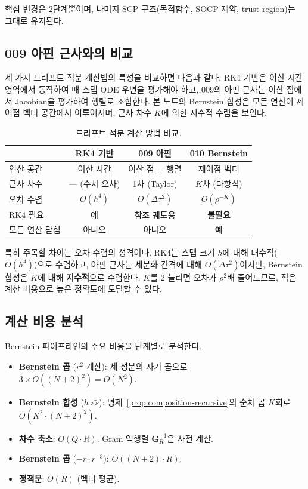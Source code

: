 \documentclass[11pt]{article}
\begin{document}
핵심 변경은 2단계뿐이며, 나머지 SCP 구조(목적함수, SOCP 제약, trust region)는
그대로 유지된다.

\subsection{009 아핀 근사와의 비교}

세 가지 드리프트 적분 계산법의 특성을 비교하면 다음과 같다.
RK4 기반은 이산 시간 영역에서 동작하여 매 스텝 ODE 우변을 평가해야 하고,
009의 아핀 근사는 이산 점에서 Jacobian을 평가하여 행렬로 조합한다.
본 노트의 Bernstein 합성은 모든 연산이 제어점 벡터 공간에서 이루어지며,
근사 차수 $K$에 의한 지수적 수렴을 보인다.

\begin{table}[!h]
\centering
\caption{드리프트 적분 계산 방법 비교.}
\label{tab:method-compare}
\small
\begin{tabular}{@{}lccc@{}}
\toprule
 & RK4 기반 & 009 아핀 & 010 Bernstein \\
\midrule
연산 공간 & 이산 시간 & 이산 점 + 행렬 & 제어점 벡터 \\
근사 차수 & --- (수치 오차) & 1차 (Taylor) & $K$차 (다항식) \\
오차 수렴 & $O(h^4)$ & $O(\Delta\tau^2)$ & $O(\rho^{-K})$ \\
RK4 필요 & 예 & 참조 궤도용 & \textbf{불필요} \\
모든 연산 닫힘 & 아니오 & 아니오 & \textbf{예} \\
\bottomrule
\end{tabular}
\end{table}

특히 주목할 차이는 오차 수렴의 성격이다.
RK4는 스텝 크기 $h$에 대해 대수적($O(h^4)$)으로 수렴하고,
아핀 근사는 세분화 간격에 대해 $O(\Delta\tau^2)$이지만,
Bernstein 합성은 $K$에 대해 \textbf{지수적}으로 수렴한다.
$K$를 2 늘리면 오차가 $\rho^2$배 줄어드므로,
적은 계산 비용으로 높은 정확도에 도달할 수 있다.

\subsection{계산 비용 분석}

Bernstein 파이프라인의 주요 비용을 단계별로 분석한다.

\begin{itemize}
  \item \textbf{Bernstein 곱} ($r^2$ 계산): 세 성분의 자기 곱으로 $3 \times O((N+2)^2) = O(N^2)$.
  \item \textbf{Bernstein 합성} ($h \circ \tilde{s}$): 명제~\ref{prop:composition-recursive}의
        순차 곱 $K$회로 $O(K^2 \cdot (N+2)^2)$.
  \item \textbf{차수 축소}: $O(Q \cdot R)$. Gram 역행렬 $\mathbf{G}_R^{-1}$은 사전 계산.
  \item \textbf{Bernstein 곱} ($-r \cdot r^{-3}$): $O((N+2) \cdot R)$.
  \item \textbf{정적분}: $O(R)$ (벡터 평균).
\end{itemize}
\end{document}
